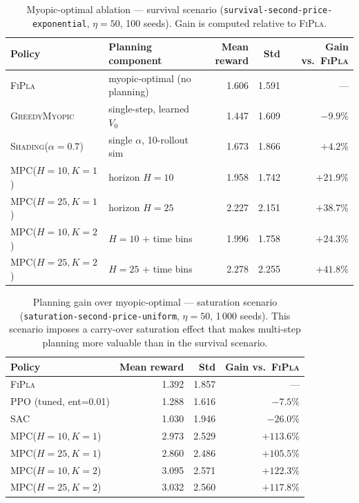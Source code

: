 \documentclass[11pt]{article}
\begin{document}
\begin{table}[h!]
\centering
\caption{Myopic-optimal ablation --- survival scenario
         (\texttt{survival-second-price-exponential}, $\eta{=}50$, 100 seeds).
         Gain is computed relative to \textsc{FiPla}.}
\label{tab:myopic-ablation}
\begin{tabular}{llrrr}
\toprule
Policy & Planning component & Mean reward & Std & Gain vs.\ \textsc{FiPla} \\
\midrule
\textsc{FiPla}                       & myopic-optimal (no planning)  & 1.606 & 1.591 & --- \\
\textsc{GreedyMyopic}                & single-step, learned $V_0$    & 1.447 & 1.609 & $-9.9\%$ \\
\textsc{Shading}($\alpha{=}0.7$)     & single $\alpha$, 10-rollout sim & 1.673 & 1.866 & $+4.2\%$ \\
\textsc{MPC}($H{=}10,K{=}1$)        & horizon $H{=}10$              & 1.958 & 1.742 & $+21.9\%$ \\
\textsc{MPC}($H{=}25,K{=}1$)        & horizon $H{=}25$              & 2.227 & 2.151 & $+38.7\%$ \\
\textsc{MPC}($H{=}10,K{=}2$)        & $H{=}10$ + time bins          & 1.996 & 1.758 & $+24.3\%$ \\
\textsc{MPC}($H{=}25,K{=}2$)        & $H{=}25$ + time bins          & 2.278 & 2.255 & $+41.8\%$ \\
\bottomrule
\end{tabular}
\end{table}

\begin{table}[h!]
\centering
\caption{Planning gain over myopic-optimal --- saturation scenario
         (\texttt{saturation-second-price-uniform}, $\eta{=}50$, 1\,000 seeds).
         This scenario imposes a carry-over saturation effect that makes multi-step
         planning more valuable than in the survival scenario.}
\label{tab:planning-gain}
\begin{tabular}{lrrr}
\toprule
Policy & Mean reward & Std & Gain vs.\ \textsc{FiPla} \\
\midrule
\textsc{FiPla}                       & 1.392 & 1.857 & --- \\
\textsc{PPO} (tuned, ent=0.01)       & 1.288 & 1.616 & $-7.5\%$ \\
\textsc{SAC}                         & 1.030 & 1.946 & $-26.0\%$ \\
\textsc{MPC}($H{=}10,K{=}1$)        & 2.973 & 2.529 & $+113.6\%$ \\
\textsc{MPC}($H{=}25,K{=}1$)        & 2.860 & 2.486 & $+105.5\%$ \\
\textsc{MPC}($H{=}10,K{=}2$)        & 3.095 & 2.571 & $+122.3\%$ \\
\textsc{MPC}($H{=}25,K{=}2$)        & 3.032 & 2.560 & $+117.8\%$ \\
\bottomrule
\end{tabular}
\end{table}
\end{document}
